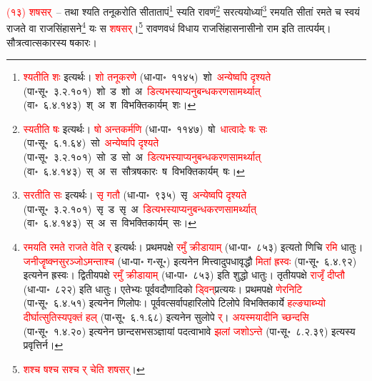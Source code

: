 \begin{sloppypar}\justifying\noindent\hspace{10mm} \textcolor{red}{(१३) शषसर्}~– तथा श्यति तनूकरोति सीता\-तापं\footnote{\textcolor{red}{श्यतीति शः} इत्यर्थः। \textcolor{red}{शो तनूकरणे} (धा॰पा॰~११४५)~\arrow शो~\arrow \textcolor{red}{अन्येष्वपि दृश्यते} (पा॰सू॰~३.२.१०१)~\arrow शो~ड~\arrow शो~अ~\arrow \textcolor{red}{डित्यभस्याप्यनु\-बन्धकरण\-सामर्थ्यात्} (वा॰~६.४.१४३)~\arrow श्~अ~\arrow श~\arrow विभक्तिकार्यम्~\arrow शः।} स्यति रावणं\footnote{\textcolor{red}{स्यतीति षः} इत्यर्थः। \textcolor{red}{षो अन्तकर्मणि} (धा॰पा॰~११४७)~\arrow षो~\arrow \textcolor{red}{धात्वादेः षः सः} (पा॰सू॰~६.१.६४)~\arrow सो~\arrow \textcolor{red}{अन्येष्वपि दृश्यते} (पा॰सू॰~३.२.१०१)~\arrow सो~ड~\arrow सो~अ~\arrow \textcolor{red}{डित्यभस्याप्यनु\-बन्धकरण\-सामर्थ्यात्} (वा॰~६.४.१४३)~\arrow स्~अ~\arrow स~\arrow सौत्रषकारः~\arrow ष~\arrow विभक्तिकार्यम्~\arrow षः।} सरत्ययोध्यां\footnote{\textcolor{red}{सरतीति सः} इत्यर्थः। \textcolor{red}{सृ गतौ} (धा॰पा॰~९३५)~\arrow सृ~\arrow \textcolor{red}{अन्येष्वपि दृश्यते} (पा॰सू॰~३.२.१०१)~\arrow सृ~ड~\arrow सृ~अ~\arrow \textcolor{red}{डित्यभस्याप्यनु\-बन्धकरण\-सामर्थ्यात्} (वा॰~६.४.१४३)~\arrow स्~अ~\arrow स~\arrow विभक्तिकार्यम्~\arrow सः।} रमयति सीतां रमते च स्वयं राजते वा राज\-सिंहासने\footnote{\textcolor{red}{रमयति रमते राजते वेति र्} इत्यर्थः। प्रथमपक्षे \textcolor{red}{रमुँ क्रीडायाम्} (धा॰पा॰~८५३) इत्यतो णिचि \textcolor{red}{रमि} धातुः। \textcolor{red}{जनी\-जॄष्क्नसु\-रञ्जोऽमन्ताश्च} (धा॰पा॰ ग॰सू॰) इत्यनेन मित्त्वादुपधा\-वृद्धौ \textcolor{red}{मितां ह्रस्वः} (पा॰सू॰~६.४.९२) इत्यनेन ह्रस्वः। द्वितीयपक्षे \textcolor{red}{रमुँ क्रीडायाम्} (धा॰पा॰~८५३) इति शुद्धो धातुः। तृतीयपक्षे \textcolor{red}{राजृँ दीप्तौ} (धा॰पा॰~८२२) इति धातुः। एतेभ्यः पूर्ववदौणादिको \textcolor{red}{ड्विन्‌}\-प्रत्ययः। प्रथमपक्षे \textcolor{red}{णेरनिटि} (पा॰सू॰~६.४.५१) इत्यनेन णिलोपः। पूर्ववत्सर्वापहारि\-लोपे टिलोपे विभक्ति\-कार्ये \textcolor{red}{हल्ङ्याब्भ्यो दीर्घात्सुतिस्यपृक्तं हल्} (पा॰सू॰~६.१.६८) इत्यनेन सुलोपे \textcolor{red}{र्}। \textcolor{red}{अयस्मयादीनि च्छन्दसि} (पा॰सू॰~१.४.२०) इत्यनेन छान्दस\-भसञ्ज्ञायां पदत्वाभावे \textcolor{red}{झलां जशोऽन्ते} (पा॰सू॰~८.२.३९) इत्यस्य प्रवृत्तिर्न।
} यः स \textcolor{red}{शषसर्}।\footnote{\textcolor{red}{शश्च षश्च सश्च र् चेति शषसर्}।} रावण\-वधं विधाय राज\-सिंहासनासीनो राम इति तात्पर्यम्। सौत्रत्वात्सकारस्य षकारः।\end{sloppypar}
